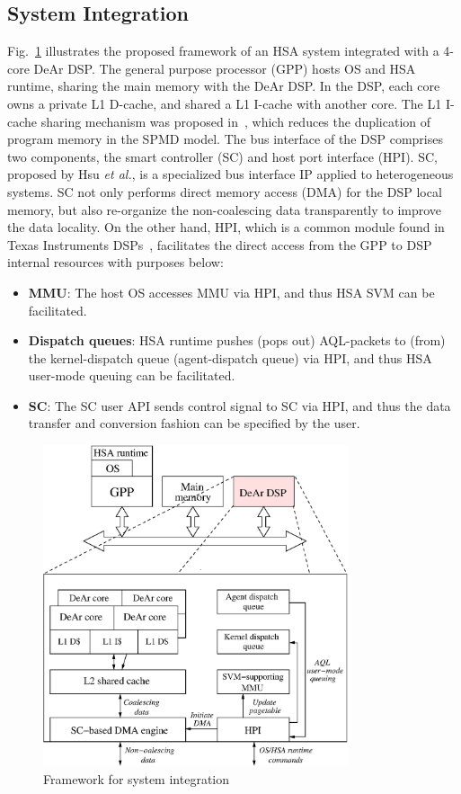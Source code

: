 \subsection{System Integration}
\label{sec:integration}
Fig.~\ref{fig:archi} illustrates the proposed framework of an HSA system integrated with a 4-core DeAr DSP.
The general purpose processor (GPP) hosts OS and HSA runtime, sharing the main memory with the DeAr DSP.
In the DSP, each core owns a private L1 D-cache, and shared a L1 I-cache with another core.
The L1 I-cache sharing mechanism was proposed in~\cite{kelly2004shared},
which reduces the duplication of program memory in the SPMD model.
The bus interface of the DSP comprises two components, the smart controller (SC) and host port interface (HPI).
SC, proposed by Hsu \textit{et al.}, is a specialized bus interface IP applied to heterogeneous systems.
SC not only performs direct memory access (DMA) for the DSP local memory,
but also re-organize the non-coalescing data transparently to improve the data locality.
On the other hand, HPI, which is a common module found in Texas Instruments DSPs~\cite{hpi},
facilitates the direct access from the GPP to DSP internal resources with purposes below:
\begin{itemize}
    \item \textbf{MMU}: The host OS accesses MMU via HPI, and thus HSA SVM can be facilitated.
    \item \textbf{Dispatch queues}: HSA runtime pushes (pops out) AQL-packets to (from) the kernel-dispatch queue (agent-dispatch queue) via HPI, 
        and thus HSA user-mode queuing can be facilitated.
    \item \textbf{SC}: The SC user API sends control signal to SC via HPI, 
        and thus the data transfer and conversion fashion can be specified by the user.
\end{itemize}

\vspace{\textfig}
\begin{figure}[!ht] 
    \centering
    \includegraphics[width=0.8\textwidth]{./figs/archi.eps}
    \caption{Framework for system integration}
    \label{fig:archi}
\end{figure}

